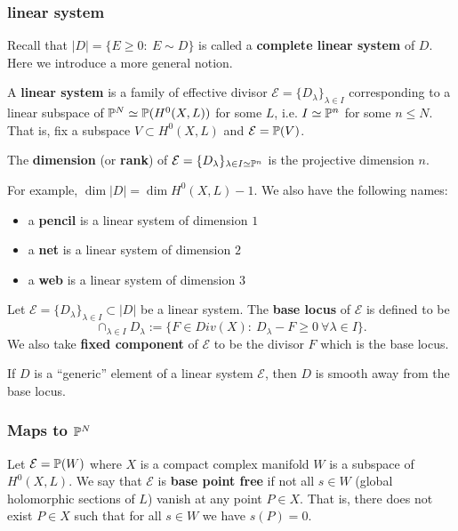 \subsubsection{linear system}

Recall that $|D|=\{E\geq 0:\ E\sim D\}$ is called a \textbf{complete linear system} of $D$. Here we introduce a more general notion.

\begin{definition}
A \textbf{linear system} is a family of effective divisor $\mathcal{E}=\{D_\lambda\}_{\lambda\in I}$ corresponding to a linear subspace of ${\mathbb P}^N\simeq {\mathbb P}(H^0(X,L))$ for some $L$, i.e. $I\simeq {\mathbb P}^n$ for some $n\leq N$. That is, fix a subspace $V\subset H^0(X,L)$ and $\mathcal{E}={\mathbb P}(V)$.
\end{definition}

\begin{definition}
The \textbf{dimension} (or \textbf{rank}) of $\mathcal{E}=\{D_\lambda\}_{\lambda\in I\simeq {\mathbb P}^n}$ is the projective dimension $n$.
\end{definition}

For example, $\dim|D|=\dim H^0(X,L)-1$. We also have the following names:
\begin{itemize}
\item a \textbf{pencil} is a linear system of dimension $1$
\item a \textbf{net} is a linear system of dimension $2$
\item a \textbf{web} is a linear system of dimension $3$
\end{itemize}

\begin{definition}
Let $\mathcal{E}=\{D_\lambda\}_{\lambda\in I}\subset |D|$ be a linear system. The \textbf{base locus} of $\mathcal{E}$ is defined to be
$$\cap_{\lambda\in I} D_\lambda :=\{F\in Div(X):\ D_\lambda-F\geq 0\ \forall \lambda\in I\}.$$
We also take \textbf{fixed component} of $\mathcal{E}$ to be the divisor $F$ which is the base locus. 
\end{definition}

\begin{theorem}[Bertini]
If $D$ is a ``generic'' element of a linear system $\mathcal{E}$, then $D$ is smooth away from the base locus.
\end{theorem}

\subsubsection{Maps to ${\mathbb P}^N$}
\begin{definition}
Let $\mathcal{E}={\mathbb P}(W)$ where $X$ is a compact complex manifold $W$ is a subspace of $H^0(X,L)$. We say that $\mathcal{E}$ is \textbf{base point free} if not all $s\in W$ (global holomorphic sections of $L$) vanish at any point $P\in X$. That is, there does not exist $P\in X$ such that for all $s\in W$ we have $s(P)=0$. 
\end{definition}

